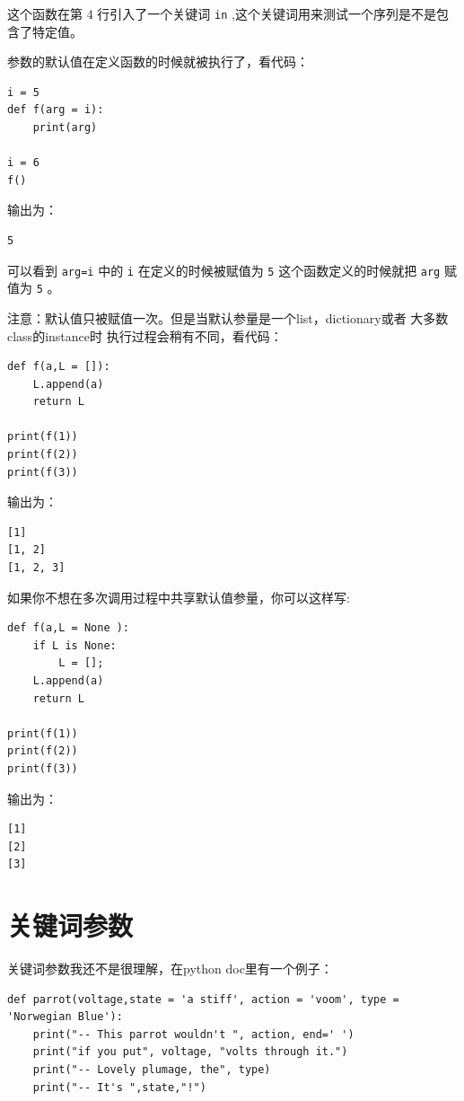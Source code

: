 \documentclass[10pt,a4paper,UTF8]{article}
\begin{document}
这个函数在第 4 行引入了一个关键词 \texttt{in} ,这个关键词用来测试一个序列是不是包含了特定值。

参数的默认值在定义函数的时候就被执行了，看代码：
\lstset{language=Python,label= ,caption= ,captionpos=b,numbers=none}
\begin{lstlisting}
i = 5
def f(arg = i):
    print(arg)

i = 6
f()
\end{lstlisting}
输出为：
\begin{verbatim}
5
\end{verbatim}



可以看到 \texttt{arg=i} 中的 \texttt{i} 在定义的时候被赋值为 \texttt{5} 这个函数定义的时候就把 \texttt{arg} 赋值为 \texttt{5} 。

注意：默认值只被赋值一次。但是当默认参量是一个list，dictionary或者 大多数class的instance时 执行过程会稍有不同，看代码：
\lstset{language=Python,label= ,caption= ,captionpos=b,firstnumber=1,numbers=left}
\begin{lstlisting}
def f(a,L = []):
    L.append(a)
    return L

print(f(1))
print(f(2))
print(f(3))
\end{lstlisting}

输出为：
\begin{verbatim}
[1]
[1, 2]
[1, 2, 3]
\end{verbatim}
如果你不想在多次调用过程中共享默认值参量，你可以这样写:
\lstset{language=Python,label= ,caption= ,captionpos=b,firstnumber=1,numbers=left}
\begin{lstlisting}
def f(a,L = None ):
    if L is None:
        L = [];
    L.append(a)
    return L

print(f(1))
print(f(2))
print(f(3))
\end{lstlisting}
输出为：
\begin{verbatim}
[1]
[2]
[3]
\end{verbatim}
\section{关键词参数}
\label{sec:orgb97d96d}


关键词参数我还不是很理解，在python doc里有一个例子：
\lstset{language=Python,label= ,caption= ,captionpos=b,firstnumber=1,numbers=left}
\begin{lstlisting}
def parrot(voltage,state = 'a stiff', action = 'voom', type = 'Norwegian Blue'):
    print("-- This parrot wouldn't ", action, end=' ')
    print("if you put", voltage, "volts through it.")
    print("-- Lovely plumage, the", type)
    print("-- It's ",state,"!")
\end{lstlisting}
\end{document}
